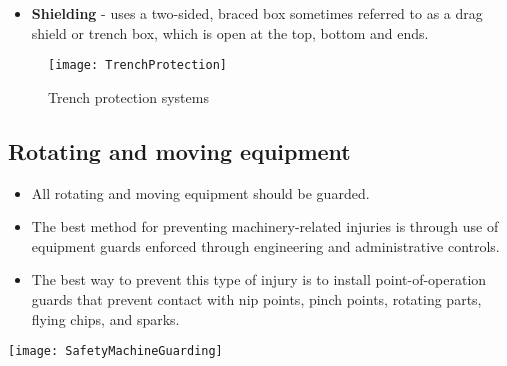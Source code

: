 \begin{itemize}
\begin{enumerate}
\begin{itemize}
\begin{itemize}
\item \textbf{Shielding}  -  uses a two-sided, braced box sometimes referred to as a drag shield or trench box, which is open at the top, bottom and ends.
\end{itemize}
\begin{figure}[H]
\begin{center}
\texttt{[image: TrenchProtection]}
\caption{Trench protection systems}
\end{center}
\end{figure}
\end{itemize}
\end{enumerate}
\end{itemize}
\subsection{Rotating and moving equipment}

\begin{itemize}
\item All rotating and moving equipment should be guarded. 
\item The best method for preventing machinery-related injuries is through use of equipment guards enforced through engineering and administrative controls.   
\item The best way to prevent this type of injury is to install point-of-operation guards that prevent contact with nip points, pinch points, rotating parts, flying chips, and sparks.
\end{itemize}
\begin{center}
\texttt{[image: SafetyMachineGuarding]}\\
\end{center}

